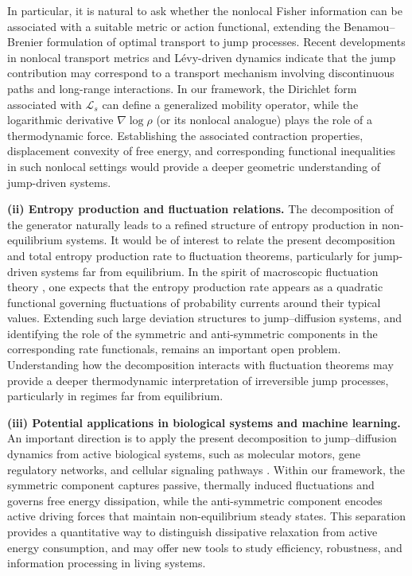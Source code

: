 \documentclass[10pt]{article}
\theoremstyle{definition}
\numberwithin{equation}{section}
\begin{document}
In particular, it is natural to ask whether the nonlocal Fisher information can be associated with a suitable metric or action functional, extending the Benamou--Brenier formulation of optimal transport to jump processes. 
Recent developments \cite{E2014, PR22} in nonlocal transport metrics and Lévy-driven dynamics indicate that the jump contribution may correspond to a transport mechanism involving discontinuous paths and long-range interactions. 
In our framework, the Dirichlet form associated with $\mathcal L_s$ can define a generalized mobility operator, while the logarithmic derivative $\nabla \log \rho$ (or its nonlocal analogue) plays the role of a thermodynamic force.
Establishing the associated contraction properties, displacement convexity of free energy, and corresponding functional inequalities in such nonlocal settings would provide a deeper geometric understanding of jump-driven systems.


\medskip
\noindent
\textbf{(ii) Entropy production and fluctuation relations.}
The decomposition of the generator naturally leads to a refined structure of entropy production in non-equilibrium systems. 
It would be of interest to relate the present decomposition and total entropy production rate to fluctuation theorems, particularly for jump-driven systems far from equilibrium.
In the spirit of macroscopic fluctuation theory \cite{esposito2010,stochasticThermo1}, one expects that the entropy production rate appears as a quadratic functional governing fluctuations of probability currents around their typical values. 
Extending such large deviation structures to jump--diffusion systems, and identifying the role of the symmetric and anti-symmetric components in the corresponding rate functionals, remains an important open problem.
Understanding how the decomposition interacts with fluctuation theorems may provide a deeper thermodynamic interpretation of irreversible jump processes, particularly in regimes far from equilibrium.


\medskip
\noindent
\textbf{(iii) Potential applications in biological systems and machine learning.}
An important direction is to apply the present decomposition to jump--diffusion dynamics from active biological systems, such as molecular motors, gene regulatory networks, and cellular signaling pathways \cite{briane2020,chen2015}. 
Within our framework, the symmetric component captures passive, thermally induced fluctuations and governs free energy dissipation, while the anti-symmetric component encodes active driving forces that maintain non-equilibrium steady states. 
This separation provides a quantitative way to distinguish dissipative relaxation from active energy consumption, and may offer new tools to study efficiency, robustness, and information processing in living systems.
\end{document}
